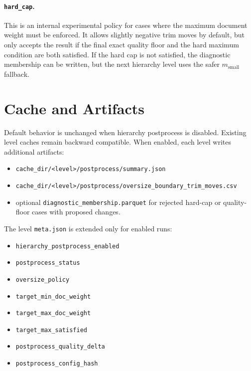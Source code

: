 \documentclass[11pt,a4paper]{article}
\begin{document}
\paragraph{\texttt{hard\_cap}.}
This is an internal experimental policy for cases where the maximum document
weight must be enforced. It allows slightly negative trim moves by default, but
only accepts the result if the final exact quality floor and the hard maximum
condition are both satisfied. If the hard cap is not satisfied, the diagnostic
membership can be written, but the next hierarchy level uses the safer
$m_{\text{small}}$ fallback.

\section{Cache and Artifacts}

Default behavior is unchanged when hierarchy postprocess is disabled. Existing
level caches remain backward compatible. When enabled, each level writes
additional artifacts:

\begin{itemize}[nosep]
    \item \texttt{cache\_dir/<level>/postprocess/summary.json}
    \item \texttt{cache\_dir/<level>/postprocess/oversize\_boundary\_trim\_moves.csv}
    \item optional \texttt{diagnostic\_membership.parquet} for rejected hard-cap
          or quality-floor cases with proposed changes.
\end{itemize}

The level \texttt{meta.json} is extended only for enabled runs:

\begin{itemize}[nosep]
    \item \texttt{hierarchy\_postprocess\_enabled}
    \item \texttt{postprocess\_status}
    \item \texttt{oversize\_policy}
    \item \texttt{target\_min\_doc\_weight}
    \item \texttt{target\_max\_doc\_weight}
    \item \texttt{target\_max\_satisfied}
    \item \texttt{postprocess\_quality\_delta}
    \item \texttt{postprocess\_config\_hash}
\end{itemize}
\end{document}
